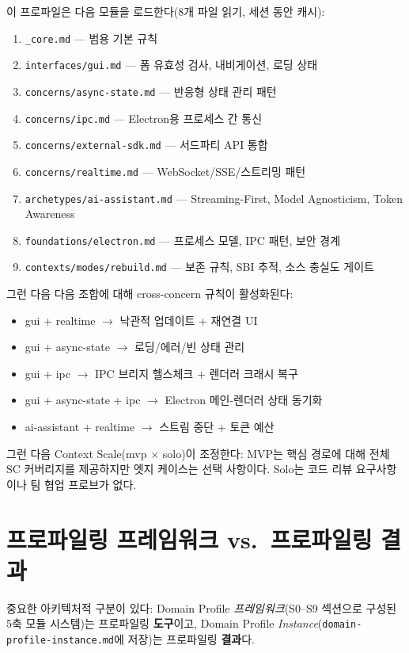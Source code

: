\documentclass[11pt,a4paper,openright,twoside]{report}
\newcommand{\file}[1]{\texttt{#1}}
\begin{document}
이 프로파일은 다음 모듈을 로드한다(8개 파일 읽기, 세션 동안 캐시):

\begin{enumerate}
  \item \file{\_core.md} --- 범용 기본 규칙
  \item \file{interfaces/gui.md} --- 폼 유효성 검사, 내비게이션, 로딩 상태
  \item \file{concerns/async-state.md} --- 반응형 상태 관리 패턴
  \item \file{concerns/ipc.md} --- Electron용 프로세스 간 통신
  \item \file{concerns/external-sdk.md} --- 서드파티 API 통합
  \item \file{concerns/realtime.md} --- WebSocket/SSE/스트리밍 패턴
  \item \file{archetypes/ai-assistant.md} --- Streaming-First, Model Agnosticism, Token Awareness
  \item \file{foundations/electron.md} --- 프로세스 모델, IPC 패턴, 보안 경계
  \item \file{contexts/modes/rebuild.md} --- 보존 규칙, SBI 추적, 소스 충실도 게이트
\end{enumerate}

그런 다음 다음 조합에 대해 cross-concern 규칙이 활성화된다:
\begin{itemize}
  \item gui + realtime $\rightarrow$ 낙관적 업데이트 + 재연결 UI
  \item gui + async-state $\rightarrow$ 로딩/에러/빈 상태 관리
  \item gui + ipc $\rightarrow$ IPC 브리지 헬스체크 + 렌더러 크래시 복구
  \item gui + async-state + ipc $\rightarrow$ Electron 메인-렌더러 상태 동기화
  \item ai-assistant + realtime $\rightarrow$ 스트림 중단 + 토큰 예산
\end{itemize}

그런 다음 Context Scale(mvp $\times$ solo)이 조정한다: MVP는 핵심 경로에 대해 전체 SC 커버리지를 제공하지만 엣지 케이스는 선택 사항이다. Solo는 코드 리뷰 요구사항이나 팀 협업 프로브가 없다.

\section{프로파일링 프레임워크 vs.\ 프로파일링 결과}

중요한 아키텍처적 구분이 있다: Domain Profile \emph{프레임워크}(S0--S9 섹션으로 구성된 5축 모듈 시스템)는 프로파일링 \textbf{도구}이고, Domain Profile \emph{Instance}(\file{domain-profile-instance.md}에 저장)는 프로파일링 \textbf{결과}다.
\end{document}
